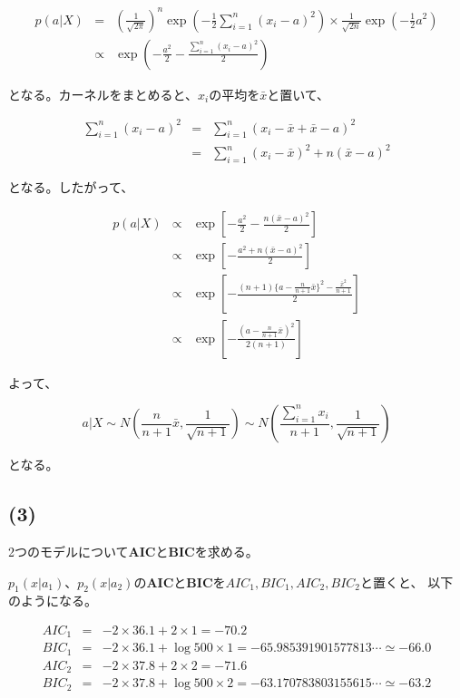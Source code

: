 \documentclass[a4j,xelatex,ja=standard,jafont=hiragino-pron, 10pt]{bxjsarticle}
\begin{document}
\begin{eqnarray}
  p(a|X)
  &=& \left(\frac{1}{\sqrt{2\pi}}\right)^n
    \exp \left(-\frac{1}{2} \sum_{i=1}^n (x_i - a)^2\right)
    \times \frac{1}{\sqrt{2n}} \exp \left(- \frac{1}{2} a^2\right) \nonumber \\
  &\propto& \exp \left(- \frac{a^2}{2} - \frac{\sum_{i=1}^n (x_i - a)^2}{2}\right)
\end{eqnarray}

となる。カーネルをまとめると、$x_i$の平均を$\bar{x}$と置いて、

\begin{eqnarray}
  \sum_{i=1}^n(x_i - a)^2
  &=& \sum_{i=1}^n (x_i - \bar{x} + \bar{x} - a)^2 \nonumber \\
  &=& \sum_{i=1}^n (x_i - \bar{x})^2 + n(\bar{x} - a)^2
\end{eqnarray}

となる。したがって、

\begin{eqnarray}
  p(a|X)
  &\propto& \exp \left[- \frac{a^2}{2} - \frac{n(\bar{x} - a)^2}{2}\right] \nonumber \\
  &\propto& \exp \left[- \frac{a^2 + n(\bar{x} - a)^2}{2} \right] \nonumber \\
  &\propto& \exp
    \left[- \frac{
      (n + 1) \{ a - \frac{n}{n+1}\bar{x} \}^2 - \frac{\bar{x}^2}{n+1}
    }{2}
    \right] \nonumber \\
  &\propto& \exp \left[ - \frac{(a - \frac{n}{n+1}\bar{x})^2}{2(n+1)}\right]
\end{eqnarray}

よって、

\begin{equation}
  a|X \sim N\left(\frac{n}{n+1}\bar{x}, \frac{1}{\sqrt{n+1}}\right) \sim N\left(\frac{\sum_{i=1}^n x_i}{n+1}, \frac{1}{\sqrt{n+1}}\right)
\end{equation}

となる。

\subsection*{(3)}

2つのモデルについて\textbf{AIC}と\textbf{BIC}を求める。

$p_1(x|a_1)$、$p_2(x|a_2)$の\textbf{AIC}と\textbf{BIC}を$AIC_1, BIC_1, AIC_2, BIC_2$と置くと、
以下のようになる。

\begin{eqnarray}
  AIC_1 &=& -2 \times 36.1 + 2 \times 1 = -70.2 \\
  BIC_1 &=& -2 \times 36.1 + \log 500 \times 1 = -65.985391901577813 \cdots \simeq -66.0 \\
  AIC_2 &=& -2 \times 37.8 + 2 \times 2 = -71.6 \\
  BIC_2 &=& -2 \times 37.8 + \log 500 \times 2 = -63.170783803155615 \cdots \simeq -63.2
\end{eqnarray}
\end{document}
